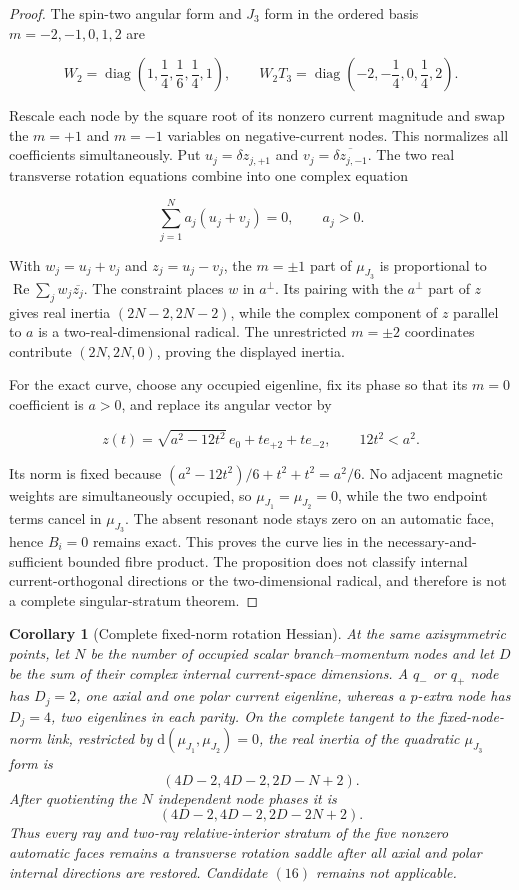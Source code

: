 \documentclass[11pt]{article}
\newtheorem{corollary}[theorem]{Corollary}
\theoremstyle{definition}
\theoremstyle{remark}
\begin{document}
\begin{proof}
The spin-two angular form and \(J_3\) form in the ordered basis
\(m=-2,-1,0,1,2\) are

\[
 W_2=\operatorname{diag}\left(1,\frac14,\frac16,\frac14,1\right),
 \qquad
 W_2T_3=\operatorname{diag}\left(-2,-\frac14,0,\frac14,2\right).
\]

Rescale each node by the square root of its nonzero current magnitude and
swap the \(m=+1\) and \(m=-1\) variables on negative-current nodes.  This
normalizes all coefficients simultaneously.  Put
\(u_j=\delta z_{j,+1}\) and
\(v_j=\overline{\delta z_{j,-1}}\).  The two real transverse rotation
equations combine into one complex equation

\[
 \sum_{j=1}^{N} a_j(u_j+v_j)=0,
 \qquad a_j>0.
\]

With \(w_j=u_j+v_j\) and \(z_j=u_j-v_j\), the \(m=\pm1\) part of
\(\mu_{J_3}\) is proportional to
\(\operatorname{Re}\sum_j w_j\overline{z_j}\).  The constraint places \(w\)
in \(a^\perp\).  Its pairing with the \(a^\perp\) part of \(z\) gives real
inertia \((2N-2,2N-2)\), while the complex component of \(z\) parallel to
\(a\) is a two-real-dimensional radical.  The unrestricted \(m=\pm2\)
coordinates contribute \((2N,2N,0)\), proving the displayed inertia.

For the exact curve, choose any occupied eigenline, fix its phase so that
its \(m=0\) coefficient is \(a>0\), and replace its angular vector by

\[
 z(t)=\sqrt{a^2-12t^2}\,e_0+t e_{+2}+t e_{-2},
 \qquad 12t^2<a^2.
\]

Its norm is fixed because
\((a^2-12t^2)/6+t^2+t^2=a^2/6\).  No adjacent magnetic weights are
simultaneously occupied, so \(\mu_{J_1}=\mu_{J_2}=0\), while the two endpoint
terms cancel in \(\mu_{J_3}\).  The absent resonant node stays zero on an
automatic face, hence \(B_i=0\) remains exact.  This proves the curve lies in
the necessary-and-sufficient bounded fibre product.  The proposition does
not classify internal current-orthogonal directions or the two-dimensional
radical, and therefore is not a complete singular-stratum theorem.
\end{proof}

\begin{corollary}[Complete fixed-norm rotation Hessian]
At the same axisymmetric points, let \(N\) be the number of occupied scalar
branch--momentum nodes and let \(D\) be the sum of their complex internal
current-space dimensions.  A \(q_-\) or \(q_+\) node has \(D_j=2\), one
axial and one polar current eigenline, whereas a \(p\)-extra node has
\(D_j=4\), two eigenlines in each parity.  On the complete tangent to the
fixed-node-norm link, restricted by
\(\mathrm d(\mu_{J_1},\mu_{J_2})=0\), the real inertia of the quadratic
\(\mu_{J_3}\) form is
\[
 (4D-2,4D-2,2D-N+2).
\]
After quotienting the \(N\) independent node phases it is
\[
 (4D-2,4D-2,2D-2N+2).
\]
Thus every ray and two-ray relative-interior stratum of the five nonzero
automatic faces remains a transverse rotation saddle after all axial and
polar internal directions are restored.  Candidate \((16)\) remains not
applicable.
\end{corollary}
\end{document}
